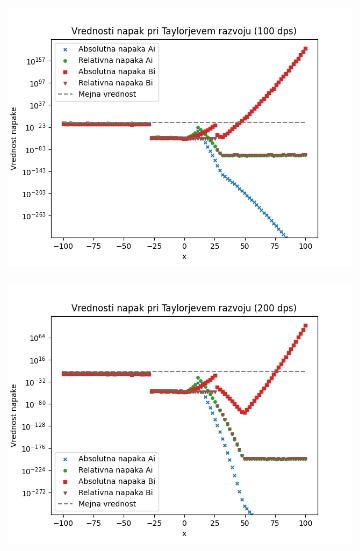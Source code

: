 \documentclass[12pt]{article}
\begin{document}
\begin{figure}
    \centering
    \begin{subfigure}{0.45\textwidth}
        \includegraphics[width=\textwidth]{NapakeZlepek100.png}
    \end{subfigure}
    \begin{subfigure}{0.45\textwidth}
        \includegraphics[width=\textwidth]{NapakeZlepek200.png}
    \end{subfigure}
    \begin{subfigure}{0.45\textwidth}

\end{subfigure}
\end{figure}
\end{document}
